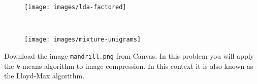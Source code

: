 \documentclass{abernethy_hw}
\begin{document}
\begin{figure*}[h!]
    \centering
    \begin{subfigure}[t]{0.5\textwidth}
        \centering
        \texttt{[image: images/lda-factored]}
    \end{subfigure}%
    ~ 
    \begin{subfigure}[t]{0.5\textwidth}
        \centering
        \texttt{[image: images/mixture-unigrams]}
    \end{subfigure}
\end{figure*}

\pagebreak
{}

Download the image \texttt{mandrill.png} from Canvas. In this problem you will apply the $k$-means algorithm to image compression. In this context it is also known as the Lloyd-Max algorithm.
\end{document}
